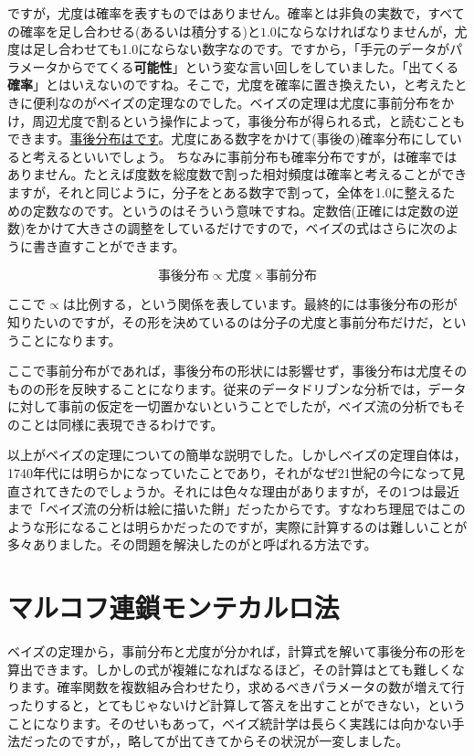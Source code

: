 \documentclass{ltjsbook}
\begin{document}
ですが，尤度は確率を表すものではありません。確率とは非負の実数で，すべての確率を足し合わせる(あるいは積分する)と$1.0$にならなければなりませんが，尤度は足し合わせても1.0にならない数字なのです。ですから，「手元のデータがパラメータからでてくる\textbf{可能性}」という変な言い回しをしていました。「出てくる\textbf{確率}」とはいえないのですね。そこで，尤度を確率に置き換えたい，と考えたときに便利なのがベイズの定理なのでした。ベイズの定理は尤度に事前分布をかけ，周辺尤度で割るという操作によって，事後分布が得られる式，と読むこともできます。\underline{事後分布はです}。尤度にある数字をかけて(事後の)確率分布にしていると考えるといいでしょう。
ちなみに事前分布も確率分布ですが，は確率ではありません。たとえば度数を総度数で割った相対頻度は確率と考えることができますが，それと同じように，分子をとある数字で割って，全体を1.0に整えるための定数なのです。というのはそういう意味ですね。定数倍(正確には定数の逆数)をかけて大きさの調整をしているだけですので，ベイズの式はさらに次のように書き直すことができます。

$$ \mbox{事後分布} \propto \mbox{尤度}\times \mbox{事前分布} $$

ここで$\propto$は比例する，という関係を表しています。最終的には事後分布の形が知りたいのですが，その形を決めているのは分子の尤度と事前分布だけだ，ということになります。

ここで事前分布がであれば，事後分布の形状には影響せず，事後分布は尤度そのものの形を反映することになります。従来のデータドリブンな分析では，データに対して事前の仮定を一切置かないということでしたが，ベイズ流の分析でもそのことは同様に表現できるわけです。

以上がベイズの定理についての簡単な説明でした。しかしベイズの定理自体は，1740年代には明らかになっていたことであり，それがなぜ21世紀の今になって見直されてきたのでしょうか。それには色々な理由がありますが，その1つは最近まで「ベイズ流の分析は絵に描いた餅」だったからです。すなわち理屈ではこのような形になることは明らかだったのですが，実際に計算するのは難しいことが多々ありました。その問題を解決したのがと呼ばれる方法です。
\section{マルコフ連鎖モンテカルロ法}
\label{MCMC}
ベイズの定理から，事前分布と尤度が分かれば，計算式を解いて事後分布の形を算出できます。しかしの式が複雑になればなるほど，その計算はとても難しくなります。確率関数を複数組み合わせたり，求めるべきパラメータの数が増えて行ったりすると，とてもじゃないけど計算して答えを出すことができない，ということになります。そのせいもあって，ベイズ統計学は長らく実践には向かない手法だったのですが，，略してが出てきてからその状況が一変しました。
\end{document}
